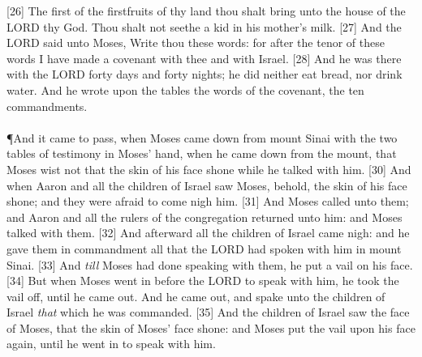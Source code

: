 [26] \textcolor[rgb]{0.00,0.00,1.00}{The first of the firstfruits of thy land thou shalt bring unto the house of the LORD thy God. Thou shalt not seethe a kid in his mother's milk.}
[27] \textcolor[rgb]{0.00,0.00,1.00}{And the LORD said unto Moses, Write thou these words: for after the tenor of these words I have made a covenant with thee and with Israel.}
[28] \textcolor[rgb]{0.00,0.00,1.00}{And he was there with the LORD forty days and forty nights; he did neither eat bread, nor drink water. And he wrote upon the tables the words of the covenant, the ten commandments.}\\
\\
\P \textcolor[rgb]{0.00,0.00,1.00}{And it came to pass, when Moses came down from mount Sinai with the two tables of testimony in Moses' hand, when he came down from the mount, that Moses wist not that the skin of his face shone while he talked with him.}
[30] \textcolor[rgb]{0.00,0.00,1.00}{And when Aaron and all the children of Israel saw Moses, behold, the skin of his face shone; and they were afraid to come nigh him.}
[31] \textcolor[rgb]{0.00,0.00,1.00}{And Moses called unto them; and Aaron and all the rulers of the congregation returned unto him: and Moses talked with them.}
[32] \textcolor[rgb]{0.00,0.00,1.00}{And afterward all the children of Israel came nigh: and he gave them in commandment all that the LORD had spoken with him in mount Sinai.}
[33] \textcolor[rgb]{0.00,0.00,1.00}{And \emph{till} Moses had done speaking with them, he put a vail on his face.}
[34] \textcolor[rgb]{0.00,0.00,1.00}{But when Moses went in before the LORD to speak with him, he took the vail off, until he came out. And he came out, and spake unto the children of Israel \emph{that} which he was commanded.}
[35] \textcolor[rgb]{0.00,0.00,1.00}{And the children of Israel saw the face of Moses, that the skin of Moses' face shone: and Moses put the vail upon his face again, until he went in to speak with him.}
\newpage
